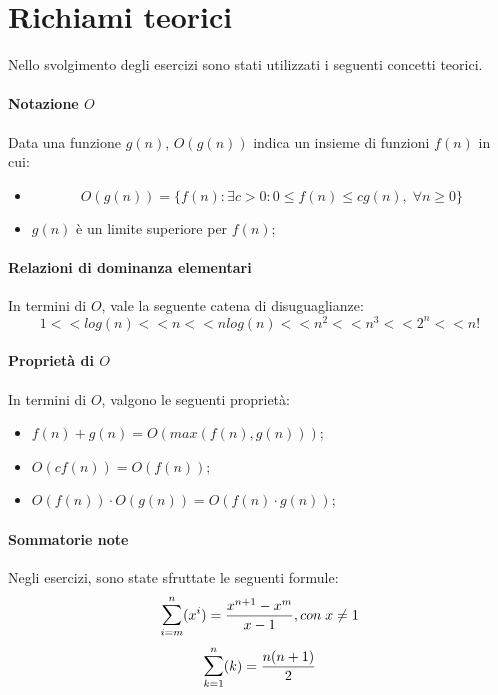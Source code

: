 \documentclass{article}
\begin{document}

\thispagestyle{empty}
\newpage

\section*{Richiami teorici} \label{s:theory}

Nello svolgimento degli esercizi sono stati utilizzati i seguenti concetti teorici.

\paragraph{Notazione $O$}
Data una funzione $g(n)$, $O(g(n))$ indica un insieme di funzioni $f(n)$ in cui:
\begin{itemize}
    \item \begin{equation*}
        O(g(n)) = \{f(n): \exists c > 0: 0 \leq f(n) \leq cg(n), \; \forall n \geq 0\}
    \end{equation*}
    \item $g(n)$ è un limite superiore per $f(n)$;
\end{itemize}

\paragraph{Relazioni di dominanza elementari}
In termini di $O$, vale la seguente catena di disuguaglianze:
\begin{equation}
    1 << log(n) << n << n log(n) << n^2 << n^3 << 2^n << n!
    \label{eq:basic}
\end{equation}

\paragraph{Proprietà di $O$}
In termini di $O$, valgono le seguenti proprietà:
\begin{itemize}
    \item $f(n) + g(n) = O(max(f(n), g(n)))$;
    \item $O(c f(n)) = O(f(n))$;
    \item $O(f(n)) \cdot O(g(n)) = O(f(n) \cdot g(n))$;
\end{itemize}

\paragraph{Sommatorie note}
Negli esercizi, sono state sfruttate le seguenti formule:
\begin{equation}
    \mathlarger{\sum}_{i=m}^{n}(x^i) = \frac{x^{n+1}-x^m}{x-1},con\; x\neq1
    \label{eq:finite_sum}
\end{equation}
\begin{equation}
    \mathlarger{\sum}_{k=1}^{n}(k) = \frac{n(n+1)}{2}
    \label{eq:first_n_sum}
\end{equation}
\end{document}
